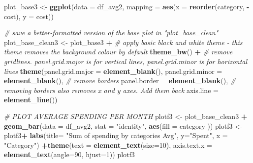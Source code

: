 \documentclass[
]{article}
\newenvironment{Shaded}{\begin{snugshade}}{\end{snugshade}}
\newcommand{\CommentTok}[1]{\textcolor[rgb]{0.56,0.35,0.01}{\textit{#1}}}
\newcommand{\DataTypeTok}[1]{\textcolor[rgb]{0.13,0.29,0.53}{#1}}
\newcommand{\DecValTok}[1]{\textcolor[rgb]{0.00,0.00,0.81}{#1}}
\newcommand{\KeywordTok}[1]{\textcolor[rgb]{0.13,0.29,0.53}{\textbf{#1}}}
\newcommand{\NormalTok}[1]{#1}
\newcommand{\OperatorTok}[1]{\textcolor[rgb]{0.81,0.36,0.00}{\textbf{#1}}}
\newcommand{\StringTok}[1]{\textcolor[rgb]{0.31,0.60,0.02}{#1}}
\begin{document}
\begin{Shaded}
\begin{Highlighting}[]
\NormalTok{plot_base3 <-}\StringTok{ }\KeywordTok{ggplot}\NormalTok{(}\DataTypeTok{data =}\NormalTok{ df_avg2, }\DataTypeTok{mapping =} \KeywordTok{aes}\NormalTok{(}\DataTypeTok{x =} \KeywordTok{reorder}\NormalTok{(category, }\OperatorTok{-}\NormalTok{cost), }\DataTypeTok{y =}\NormalTok{ cost))}

\CommentTok{# save a better-formatted version of the base plot in "plot_base_clean"}
\NormalTok{plot_base_clean3 <-}\StringTok{ }\NormalTok{plot_base3 }\OperatorTok{+}\StringTok{ }
\StringTok{  }\CommentTok{# apply basic black and white theme - this theme removes the background colour by default}
\StringTok{  }\KeywordTok{theme_bw}\NormalTok{() }\OperatorTok{+}\StringTok{ }
\StringTok{  }\CommentTok{# remove gridlines. panel.grid.major is for vertical lines, panel.grid.minor is for horizontal lines}
\StringTok{  }\KeywordTok{theme}\NormalTok{(}\DataTypeTok{panel.grid.major =} \KeywordTok{element_blank}\NormalTok{(), }\DataTypeTok{panel.grid.minor =} \KeywordTok{element_blank}\NormalTok{(),}
        \CommentTok{# remove borders}
        \DataTypeTok{panel.border =} \KeywordTok{element_blank}\NormalTok{(),}
        \CommentTok{# removing borders also removes x and y axes. Add them back}
        \DataTypeTok{axis.line =} \KeywordTok{element_line}\NormalTok{())}

\CommentTok{# PLOT AVERAGE SPENDING PER MONTH}
\NormalTok{plotf3 <-}\StringTok{ }\NormalTok{plot_base_clean3 }\OperatorTok{+}\StringTok{ }\KeywordTok{geom_bar}\NormalTok{(}\DataTypeTok{data =}\NormalTok{ df_avg2, }\DataTypeTok{stat =} \StringTok{"identity"}\NormalTok{, }\KeywordTok{aes}\NormalTok{(}\DataTypeTok{fill =}\NormalTok{ category ))  }
\NormalTok{plotf3 <-}\StringTok{ }\NormalTok{plotf3}\OperatorTok{+}\StringTok{ }\KeywordTok{labs}\NormalTok{(}\DataTypeTok{title=} \StringTok{"Sum of spending by categories Avg"}\NormalTok{, }\DataTypeTok{y=}\StringTok{"Spent"}\NormalTok{, }\DataTypeTok{x =} \StringTok{"Category"}\NormalTok{) }\OperatorTok{+}\KeywordTok{theme}\NormalTok{(}\DataTypeTok{text =} \KeywordTok{element_text}\NormalTok{(}\DataTypeTok{size=}\DecValTok{10}\NormalTok{), }\DataTypeTok{axis.text.x =} \KeywordTok{element_text}\NormalTok{(}\DataTypeTok{angle=}\DecValTok{90}\NormalTok{, }\DataTypeTok{hjust=}\DecValTok{1}\NormalTok{)) }
\NormalTok{plotf3}
\end{Highlighting}
\end{Shaded}
\end{document}
